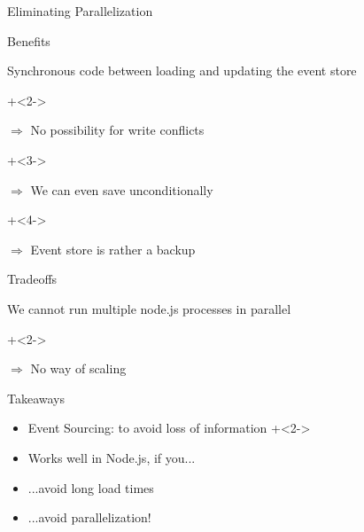 \begin{frame}[fragile]{Eliminating Parallelization}
\begin{center}
\end{center}

\end{frame}


\begin{frame}[fragile]{Benefits}

Synchronous code between loading and updating the event store

\onslide+<2->
\vspace{2em}

$\Longrightarrow$ No possibility for write conflicts

\onslide+<3->
\vspace{2em}

$\Longrightarrow$ We can even save unconditionally

\onslide+<4->
\vspace{2em}

$\Longrightarrow$ Event store is rather a backup

\end{frame}

\begin{frame}[fragile]{Tradeoffs}

We cannot run multiple node.js processes in parallel

\onslide+<2->
\vspace{2em}

$\Longrightarrow$ No way of scaling

\end{frame}

\begin{frame}[fragile]{Takeaways}

\begin{itemize}
\item Event Sourcing: to avoid loss of information
\onslide+<2->
\item Works well in Node.js, if you...
\item ...avoid long load times
\item ...avoid parallelization!
\end{itemize}

\end{frame}


